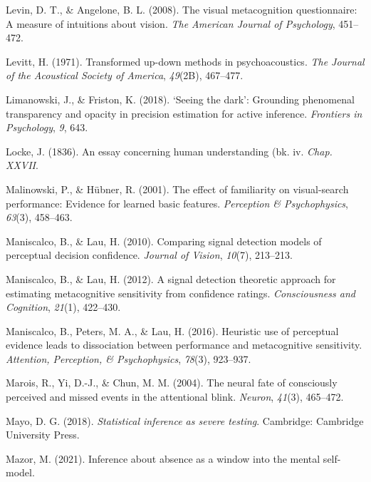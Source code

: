 \documentclass[12pt,twoside]{reedthesis}
\newenvironment{CSLReferences}%
  {}%
  {\par}
\begin{document}
\begin{CSLReferences}{1}{0}
\leavevmode\hypertarget{ref-levin2008visual}{}%
Levin, D. T., \& Angelone, B. L. (2008). The visual metacognition questionnaire: A measure of intuitions about vision. \emph{The American Journal of Psychology}, 451--472.

\leavevmode\hypertarget{ref-levitt1971transformed}{}%
Levitt, H. (1971). Transformed up-down methods in psychoacoustics. \emph{The Journal of the Acoustical Society of America}, \emph{49}(2B), 467--477.

\leavevmode\hypertarget{ref-limanowski2018seeing}{}%
Limanowski, J., \& Friston, K. (2018). {`Seeing the dark'}: Grounding phenomenal transparency and opacity in precision estimation for active inference. \emph{Frontiers in Psychology}, \emph{9}, 643.

\leavevmode\hypertarget{ref-locke1836essay}{}%
Locke, J. (1836). An essay concerning human understanding (bk. iv. \emph{Chap. XXVII}.

\leavevmode\hypertarget{ref-malinowski2001effect}{}%
Malinowski, P., \& Hübner, R. (2001). The effect of familiarity on visual-search performance: Evidence for learned basic features. \emph{Perception \& Psychophysics}, \emph{63}(3), 458--463.

\leavevmode\hypertarget{ref-maniscalco2010comparing}{}%
Maniscalco, B., \& Lau, H. (2010). Comparing signal detection models of perceptual decision confidence. \emph{Journal of Vision}, \emph{10}(7), 213--213.

\leavevmode\hypertarget{ref-maniscalco2012signal}{}%
Maniscalco, B., \& Lau, H. (2012). A signal detection theoretic approach for estimating metacognitive sensitivity from confidence ratings. \emph{Consciousness and Cognition}, \emph{21}(1), 422--430.

\leavevmode\hypertarget{ref-maniscalco2016heuristic}{}%
Maniscalco, B., Peters, M. A., \& Lau, H. (2016). Heuristic use of perceptual evidence leads to dissociation between performance and metacognitive sensitivity. \emph{Attention, Perception, \& Psychophysics}, \emph{78}(3), 923--937.

\leavevmode\hypertarget{ref-marois2004neural}{}%
Marois, R., Yi, D.-J., \& Chun, M. M. (2004). The neural fate of consciously perceived and missed events in the attentional blink. \emph{Neuron}, \emph{41}(3), 465--472.

\leavevmode\hypertarget{ref-mayo2018statistical}{}%
Mayo, D. G. (2018). \emph{Statistical inference as severe testing}. Cambridge: Cambridge University Press.

\leavevmode\hypertarget{ref-mazor2021inference}{}%
Mazor, M. (2021). Inference about absence as a window into the mental self-model.


\end{CSLReferences}
\end{document}
